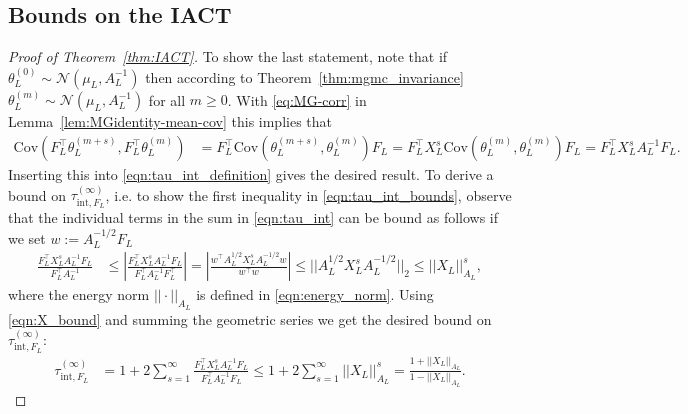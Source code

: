 \documentclass[11pt,english]{article}
\theoremstyle{plain}
\theoremstyle{plain}
\theoremstyle{plain}
\theoremstyle{plain}
\numberwithin{equation}{section}
\newcommand{\rev}[1]{#1}
\begin{document}
\subsection{Bounds on the IACT}\label{sec:proof_IACT_bounds}
\begin{proof}[Proof of Theorem~\ref{thm:IACT}]
	\rev{To show the last statement,}  
	note that if $\theta_L^{(0)}\sim \mathcal{N}(\mu_L,A_L^{-1})$ then according to Theorem~\ref{thm:mgmc_invariance} $\theta_L^{(m)}\sim \mathcal{N}(\mu_L,A_L^{-1})$ for all $m\ge 0$. 
	With \eqref{eq:MG-corr} in Lemma~\ref{lem:MGidentity-mean-cov} this implies that
	\[
		\begin{aligned}
			\text{Cov}(F_{L}^{\top}\theta_L^{(m+s)},F_{L}^{\top}\theta_L^{(m)}) & =
			F_{L}^{\top} \text{Cov}(\theta_L^{(m+s)},\theta_L^{(m)})F_{L}                           =
			F_{L}^{\top} X_L^s \text{Cov}(\theta_L^{(m)},\theta_L^{(m)})F_{L}                    = F_{L}^{\top} X_L^s A_L^{-1}F_{L}.
		\end{aligned}
	\]
	Inserting this into \eqref{eqn:tau_int_definition} gives the desired result.
	To derive a bound on $\rev{\tau^{(\infty)}_{\mathrm{int},F_L}}$, i.e. to show the first inequality in \eqref{eqn:tau_int_bounds}, observe that the individual terms in the sum in \eqref{eqn:tau_int} can be bound as follows if we set $w:=A_{L}^{-1/2}F_{L}$
	\begin{equation}
		\begin{aligned}\frac{F_{L}^{\top}X_{L}^{s}A_{L}^{-1}F_{L}}{F_{L}^{\top}A_{L}^{-1}} & \le\left|\frac{F_{L}^{\top}X_{L}^{s}A_{L}^{-1}F_{L}}{F_{L}^{\top}A_{L}^{-1}F_{L}^{\top}}\right|  =\left|\frac{w^{\top}A_{L}^{1/2}X_{L}^{s}A_{L}^{-1/2}w}{w^{\top}w}\right|  \le||A_{L}^{1/2}X_{L}^{s}A_{L}^{-1/2}||_{2}\le||X_{L}||_{A_{L}}^{s} ,
		\end{aligned}
		\label{eqn:X_bound}
	\end{equation}
	where the energy norm $||\cdot||_{A_L}$ is defined in \eqref{eqn:energy_norm}. Using \eqref{eqn:X_bound} and summing the geometric series we get the desired bound on $\rev{\tau^{(\infty)}_{\mathrm{int},F_L}}$:
	\begin{equation}
		\begin{aligned}\rev{\tau^{(\infty)}_{\mathrm{int},F_L}} & =1+2\sum_{s=1}^{\infty}\frac{F_{L}^{\top}X_{L}^{s}A_{L}^{-1}F_{L}}{F_{L}^{\top}A_{L}^{-1}F_{L}}\le1+2\sum_{s=1}^{\infty}||X_{L}||_{A_{L}}^{s}=\frac{1+||X_{L}||_{A_{L}}}{1-||X_{L}||_{A_{L}}}.
		\end{aligned}

\end{equation}
\end{proof}
\end{document}
